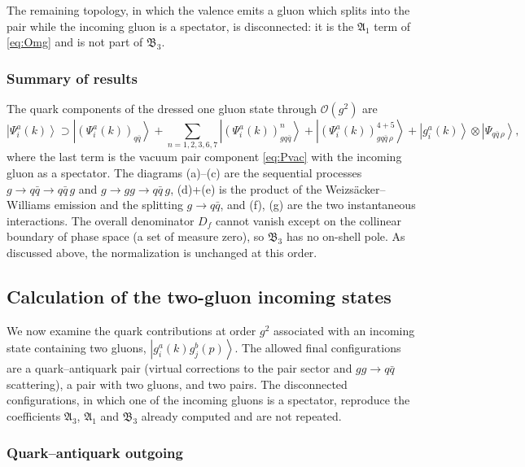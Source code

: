 \documentclass[11pt,a4paper]{article}
\numberwithin{equation}{section}
\newcommand{\mf}[1]{\mathfrak{#1}}
\newcommand{\ket}[1]{\left|#1\right\rangle}
\newcommand{\gl}[3]{g^{#1}_{#2}(#3)}
\newcommand{\order}[1]{\mathcal{O}(#1)}
\begin{document}
The remaining topology, in which the valence emits a gluon which splits into the pair while the
incoming gluon is a spectator, is disconnected: it is the $\mf A_{1}$ term of \eqref{eq:Omg} and is
not part of $\mf B_{3}$.

\subsubsection{Summary of results}
\label{sec:sum-g}

The quark components of the dressed one gluon state through $\order{g^{2}}$ are
\begin{equation}
\ket{\Psi^{a}_{i}(k)}\supset\ket{(\Psi^{a}_{i}(k))_{q\bar q}}
+\sum_{n=1,2,3,6,7}\ket{(\Psi^{a}_{i}(k))^{n}_{gq\bar q}}
+\ket{(\Psi^{a}_{i}(k))^{4+5}_{gq\bar q\,\rho}}
+\ket{\gl{a}{i}{k}}\otimes\ket{\Psi_{q\bar q\,\rho}} ,
\label{eq:sum-g}
\end{equation}
where the last term is the vacuum pair component \eqref{eq:Pvac} with the incoming gluon as a
spectator. The diagrams (a)--(c) are the sequential processes $g\to q\bar q\to q\bar q\,g$ and
$g\to gg\to q\bar q\,g$, (d)+(e) is the product of the Weizs\"acker--Williams emission and the
splitting $g\to q\bar q$, and (f), (g) are the two instantaneous interactions. The overall
denominator $D_{f}$ cannot vanish except on the collinear boundary of phase space (a set of
measure zero), so $\mf B_{3}$ has no on-shell pole. As discussed above, the normalization is
unchanged at this order.

\subsection{Calculation of the two-gluon incoming states}
\label{sec:wf-gg}

We now examine the quark contributions at order $g^{2}$ associated with an incoming state
containing two gluons, $\ket{\gl{a}{i}{k}\gl{b}{j}{p}}$. The allowed final configurations are a
quark--antiquark pair (virtual corrections to the pair sector and $gg\to q\bar q$ scattering),
a pair with two gluons, and two pairs. The disconnected configurations, in which one of the
incoming gluons is a spectator, reproduce the coefficients $\mf A_{3}$, $\mf A_{1}$ and $\mf B_{3}$
already computed and are not repeated.

\subsubsection{Quark--antiquark outgoing}
\end{document}
